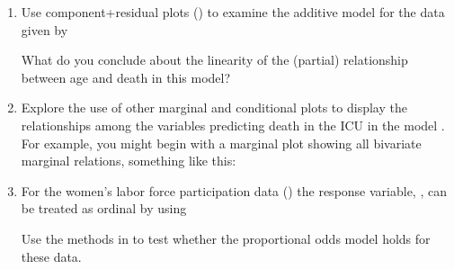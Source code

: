 \documentclass[11pt]{book}
\renewenvironment{knitrout}{\small\renewcommand{\baselinestretch}{.85}}{} %
\begin{document}
\begin{enumerate}
\item Use component+residual plots () to examine the additive model for the  data
given by 
\begin{knitrout}
\color{fgcolor}\begin{kframe}
\begin{alltt}
 \hlkwb{<-}  \hlopt{~}  \hlopt{+}   \hlopt{+}  \hlopt{+} 
                 
\end{alltt}
\end{kframe}
\end{knitrout}
\noindent What do you conclude about the linearity of the 
(partial) relationship between age and death in this model?

\item Explore the use of other marginal and conditional plots to display the relationships
among the variables predicting death in the ICU in the model .  
For example, you might begin with a marginal  plot showing all bivariate
marginal relations, something like this:
\begin{knitrout}
\color{fgcolor}\begin{kframe}
\begin{alltt}
\hlstd{(ICU[,}\hlstd{(}\hlstd{,} \hlstd{,} \hlstd{,} \hlstd{,} \hlstd{)],}
  \hlstd{=}\hlstd{(}\hlstd{=}\hlstd{,} \hlstd{=}\hlstd{),}
  \hlstd{=}\hlstd{(}
                   \hlstd{=}\hlstd{(}\hlstd{=}\hlopt{:}\hlstd{)))}
\end{alltt}
\end{kframe}
\end{knitrout}


\item For the women's labor force participation data ()
  the response variable, , can be treated as ordinal by
  using
\begin{knitrout}
\color{fgcolor}\begin{kframe}
\begin{alltt}
\hlopt{$} \hlkwb{<-} \hlopt{$}
                          \hlstd{=}\hlstd{(}\hlstd{,} \hlstd{,} \hlstd{))}
\end{alltt}
\end{kframe}
\end{knitrout}
  Use the methods in  to test whether the proportional
  odds model holds for these data.  


\end{enumerate}
\end{document}
